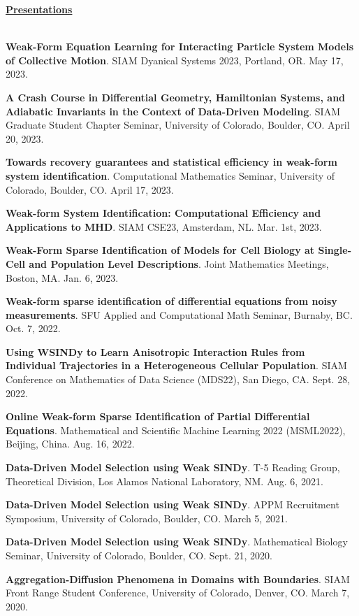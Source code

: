 \documentclass[letterpaper,11pt,oneside]{article}
\newcommand{\headr}[1]{\vspace{10pt}\uline{\Large{\textbf{#1}} \hfill } \\ \vspace{-10pt}\\}
\begin{document}
\headr{Presentations}
\begin{enumerate}[label={[\arabic*]}]
\item \textbf{Weak-Form Equation Learning for Interacting Particle System Models of Collective Motion}. SIAM Dyanical Systems 2023, Portland, OR. May 17, 2023.
\item \textbf{A Crash Course in Differential Geometry, Hamiltonian Systems, and Adiabatic Invariants in the Context of Data-Driven Modeling}. SIAM Graduate Student Chapter Seminar, University of Colorado, Boulder, CO. April 20, 2023.
\item \textbf{Towards recovery guarantees and statistical efficiency in weak-form system identification}. Computational Mathematics Seminar, University of Colorado, Boulder, CO. April 17, 2023.
\item \textbf{Weak-form System Identification: Computational Efficiency and Applications to MHD}. SIAM CSE23, Amsterdam, NL. Mar. 1st, 2023.
\item \textbf{Weak-Form Sparse Identification of Models for Cell Biology at Single-Cell and Population Level Descriptions}. Joint Mathematics Meetings, Boston, MA. Jan. 6, 2023.
\item \textbf{Weak-form sparse identification of differential equations from noisy measurements}. SFU Applied and Computational Math Seminar, Burnaby, BC. Oct. 7, 2022.
\item \textbf{Using WSINDy to Learn Anisotropic Interaction 
Rules from Individual Trajectories in a Heterogeneous Cellular Population}. SIAM Conference on Mathematics of Data Science (MDS22), San Diego, CA. Sept. 28, 2022.
\item \textbf{Online Weak-form Sparse Identification of Partial Differential Equations}. Mathematical and Scientific Machine Learning 2022 (MSML2022), Beijing, China. Aug. 16, 2022.
\item \textbf{Data-Driven Model Selection using Weak SINDy}. T-5 Reading Group, Theoretical Division, Los Alamos National Laboratory, NM. Aug. 6, 2021.
\item \textbf{Data-Driven Model Selection using Weak SINDy}. APPM Recruitment Symposium, University of Colorado, Boulder, CO. March 5, 2021.
\item \textbf{Data-Driven Model Selection using Weak SINDy}. Mathematical Biology Seminar, University of Colorado, Boulder, CO. Sept. 21, 2020.
\item \textbf{Aggregation-Diffusion Phenomena in Domains with Boundaries}. SIAM Front Range Student Conference, University of Colorado, Denver, CO. March 7, 2020.

\end{enumerate}
\end{document}
